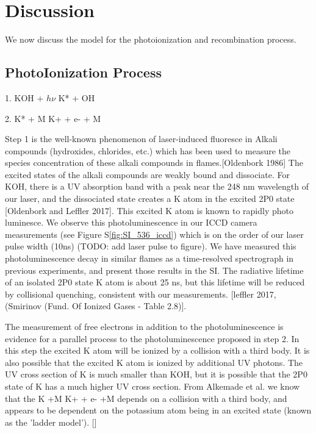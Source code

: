 \section{Discussion}

We now discuss the model for the photoionization and recombination process. 

\subsection{PhotoIonization Process}

1. KOH + $h\nu$ \rightarrow K* + OH

2. K* + M \rightarrow K+ + e- + M


Step 1 is the well-known phenomenon of laser-induced fluoresce in Alkali compounds (hydroxides, chlorides, etc.) which has been used to measure the species concentration of these alkali compounds in flames.[Oldenbork 1986] The excited states of the alkali compounds are weakly bound and dissociate. For KOH, there is a UV absorption band with a peak near the 248 nm wavelength of our laser, and the dissociated state creates a K atom in the excited 2P0 state [Oldenbork and Leffler 2017]. This excited K atom is known to rapidly photo luminesce. We observe this photoluminescence in our ICCD camera measurements (see Figure S\ref*{fig:SI_536_iccd}) which is on the order of our laser pulse width (10ns) (TODO: add laser pulse to figure). We have measured this photoluminescence decay in similar flames as a time-resolved spectrograph in previous experiments, and present those results in the SI. The radiative lifetime of an isolated 2P0 state K atom is about 25 ns, but this lifetime will be reduced by collisional quenching, consistent with our measurements. [leffler 2017, (Smirinov (Fund. Of Ionized Gases - Table 2.8)]. 

The measurement of free electrons in addition to the photoluminescence is evidence for a parallel process to the photoluminescence proposed in step 2. In this step the excited K atom will be ionized by a collision with a third body. It is also possible that the excited K atom is ionized by additional UV photons. The UV cross section of K is much smaller than KOH, but it is possible that the 2P0 state of K has a much higher UV cross section. From Alkemade et al. we know that the K +M \rightarrow K+ + e- +M depends on a collision with a third body, and appears to be dependent on the potassium atom being in an excited state (known as the 'ladder model'). []

